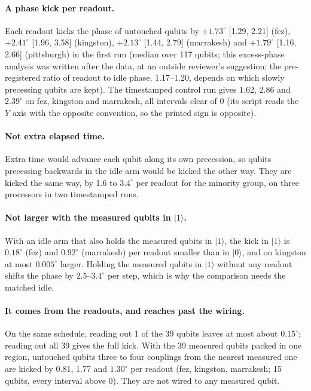 \documentclass[reprint,amsmath,amssymb,aps,superscriptaddress,nofootinbib]{revtex4-2}
\begin{document}
\paragraph*{A phase kick per readout.} Each readout kicks the phase of untouched qubits by $+1.73^\circ$ [1.29, 2.21] (fez), $+2.41^\circ$ [1.96, 3.58] (kingston), $+2.13^\circ$ [1.44, 2.79] (marrakesh) and $+1.79^\circ$ [1.16, 2.66] (pittsburgh) in the first run (median over 117 qubits; this excess-phase analysis was written after the data, at an outside reviewer's suggestion; the pre-registered ratio of readout to idle phase, 1.17--1.20, depends on which slowly precessing qubits are kept). The timestamped control run gives 1.62, 2.86 and $2.39^\circ$ on fez, kingston and marrakesh, all intervals clear of 0 (its script reads the $Y$ axis with the opposite convention, so the printed sign is opposite).

\paragraph*{Not extra elapsed time.} Extra time would advance each qubit along its own precession, so qubits precessing backwards in the idle arm would be kicked the other way. They are kicked the same way, by 1.6 to $3.4^\circ$ per readout for the minority group, on three processors in two timestamped runs.

\paragraph*{Not larger with the measured qubits in $|1\rangle$.} With an idle arm that also holds the measured qubits in $|1\rangle$, the kick in $|1\rangle$ is $0.18^\circ$ (fez) and $0.92^\circ$ (marrakesh) per readout smaller than in $|0\rangle$, and on kingston at most $0.005^\circ$ larger. Holding the measured qubits in $|1\rangle$ without any readout shifts the phase by $2.5$--$3.4^\circ$ per step, which is why the comparison needs the matched idle.

\paragraph*{It comes from the readouts, and reaches past the wiring.} On the same schedule, reading out 1 of the 39 qubits leaves at most about $0.15^\circ$; reading out all 39 gives the full kick. With the 39 measured qubits packed in one region, untouched qubits three to four couplings from the nearest measured one are kicked by 0.81, 1.77 and $1.30^\circ$ per readout (fez, kingston, marrakesh; 15 qubits, every interval above 0). They are not wired to any measured qubit.
\end{document}
